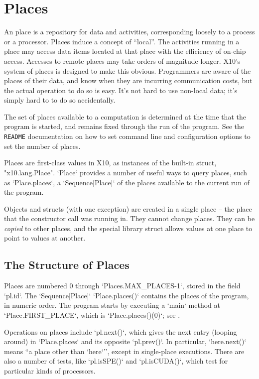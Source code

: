 
\chapter{Places}
\label{XtenPlaces}

An \Xten{} place is a repository for data and activities, corresponding
loosely to a process or a processor. Places induce a concept of ``local''. The
activities running in a place may access data items located at that place with
the efficiency of on-chip access. Accesses to remote places may take orders of
magnitude longer. X10's system of places is designed to make this obvious.
Programmers are aware of the places of their data, and know when they are
incurring communication costs, but the actual operation to do so is easy. It's
not hard to use non-local data; it's simply hard to to do so accidentally.

The set of places available to a computation is determined at the time that
the program is started, and remains fixed through the run of the program. See
the {\tt README} documentation on how to set command line and configuration
options to set the number of places.

Places are first-class values in X10, as instances of the built-in struct,
\xcd"x10.lang.Place".   \xcd`Place` provides a number of useful ways to
query places, such as \xcd`Place.places`, a \xcd`Sequence[Place]` of 
the places
available to the current run of the program.

Objects and structs (with one exception) are created in a single place -- the
place that the constructor call was running in. They cannot change places.
They can be {\em copied} to other places, and the special library struct
 allows values at one place to point to values at another.  

\section{The Structure of Places}

Places are numbered 0 through \xcd`Places.MAX_PLACES-1`, stored in the field
\xcd`pl.id`.  The \xcd`Sequence[Place]` \xcd`Place.places()` contains the places of the
program, in numeric order. 
The program starts by executing a \xcd`main` method at
\xcd`Place.FIRST_PLACE`, which is 
\xcd`Place.places()(0)`; see
. 

Operations on places include \xcd`pl.next()`, which gives the next entry
(looping around) in \xcd`Place.places` and its opposite \xcd`pl.prev()`. In
particular, \xcd`here.next()` means ``a place other than \xcd`here`'', except
in single-place executions.
There are also a number of tests, like \xcd`pl.isSPE()` and 
\xcd`pl.isCUDA()`, which test for particular kinds of processors.




